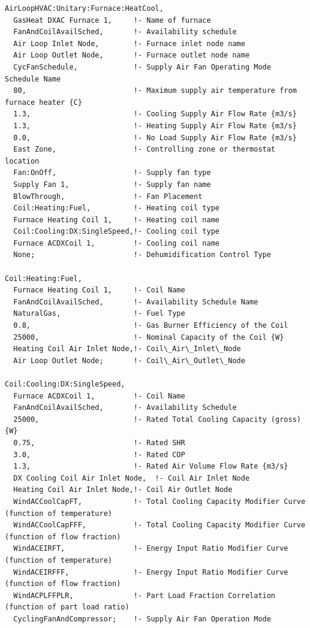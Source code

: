 \begin{lstlisting}
AirLoopHVAC:Unitary:Furnace:HeatCool,
  GasHeat DXAC Furnace 1,     !- Name of furnace
  FanAndCoilAvailSched,       !- Availability schedule
  Air Loop Inlet Node,        !- Furnace inlet node name
  Air Loop Outlet Node,       !- Furnace outlet node name
  CycFanSchedule,             !- Supply Air Fan Operating Mode Schedule Name
  80,                         !- Maximum supply air temperature from furnace heater {C}
  1.3,                        !- Cooling Supply Air Flow Rate {m3/s}
  1.3,                        !- Heating Supply Air Flow Rate {m3/s}
  0.0,                        !- No Load Supply Air Flow Rate {m3/s}
  East Zone,                  !- Controlling zone or thermostat location
  Fan:OnOff,                  !- Supply fan type
  Supply Fan 1,               !- Supply fan name
  BlowThrough,                !- Fan Placement
  Coil:Heating:Fuel,          !- Heating coil type
  Furnace Heating Coil 1,     !- Heating coil name
  Coil:Cooling:DX:SingleSpeed,!- Cooling coil type
  Furnace ACDXCoil 1,         !- Cooling coil name
  None;                       !- Dehumidification Control Type

Coil:Heating:Fuel,
  Furnace Heating Coil 1,     !- Coil Name
  FanAndCoilAvailSched,       !- Availability Schedule Name
  NaturalGas,                 !- Fuel Type
  0.8,                        !- Gas Burner Efficiency of the Coil
  25000,                      !- Nominal Capacity of the Coil {W}
  Heating Coil Air Inlet Node,!- Coil\_Air\_Inlet\_Node
  Air Loop Outlet Node;       !- Coil\_Air\_Outlet\_Node

Coil:Cooling:DX:SingleSpeed,
  Furnace ACDXCoil 1,         !- Coil Name
  FanAndCoilAvailSched,       !- Availability Schedule
  25000,                      !- Rated Total Cooling Capacity (gross) {W}
  0.75,                       !- Rated SHR
  3.0,                        !- Rated COP
  1.3,                        !- Rated Air Volume Flow Rate {m3/s}
  DX Cooling Coil Air Inlet Node,  !- Coil Air Inlet Node
  Heating Coil Air Inlet Node,!- Coil Air Outlet Node
  WindACCoolCapFT,            !- Total Cooling Capacity Modifier Curve (function of temperature)
  WindACCoolCapFFF,           !- Total Cooling Capacity Modifier Curve (function of flow fraction)
  WindACEIRFT,                !- Energy Input Ratio Modifier Curve (function of temperature)
  WindACEIRFFF,               !- Energy Input Ratio Modifier Curve (function of flow fraction)
  WindACPLFFPLR,              !- Part Load Fraction Correlation (function of part load ratio)
  CyclingFanAndCompressor;    !- Supply Air Fan Operation Mode


\end{lstlisting}
